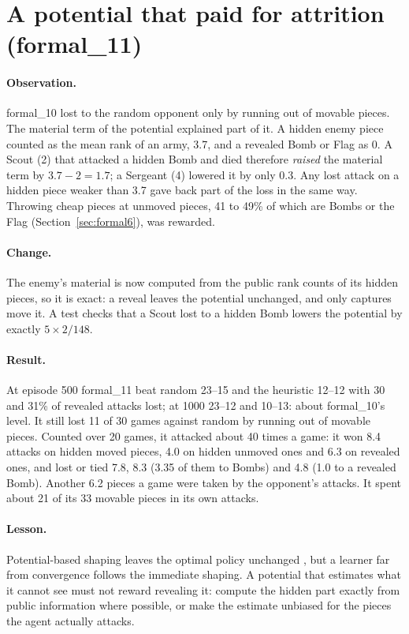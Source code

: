 \section{A potential that paid for attrition (formal\_11)}
\label{sec:formal11}

\paragraph{Observation.} formal\_10 lost to the random opponent only by running out of movable
pieces. The material term of the potential explained part of it. A hidden enemy piece counted as
the mean rank of an army, 3.7, and a revealed Bomb or Flag as 0. A Scout (2) that attacked a
hidden Bomb and died therefore \emph{raised} the material term by $3.7 - 2 = 1.7$; a Sergeant (4)
lowered it by only 0.3. Any lost attack on a hidden piece weaker than 3.7 gave back part of the
loss in the same way. Throwing cheap pieces at unmoved pieces, 41 to 49\% of which are Bombs or the
Flag (Section~\ref{sec:formal6}), was rewarded.

\paragraph{Change.} The enemy's material is now computed from the public rank counts of its hidden
pieces, so it is exact: a reveal leaves the potential unchanged, and only captures move it. A
test checks that a Scout lost to a hidden Bomb lowers the potential by exactly $5 \times 2/148$.

\paragraph{Result.} At episode 500 formal\_11 beat random 23--15 and the heuristic 12--12 with 30
and 31\% of revealed attacks lost; at 1000 23--12 and 10--13: about formal\_10's level. It still lost
11 of 30 games against random by running out of movable pieces. Counted over 20 games, it attacked
about 40 times a game: it won 8.4 attacks on hidden moved pieces, 4.0 on hidden unmoved ones and 6.3
on revealed ones, and lost or tied 7.8, 8.3 (3.35 of them to Bombs) and 4.8 (1.0 to a revealed Bomb).
Another 6.2 pieces a game were taken by the opponent's attacks. It spent about 21 of its 33 movable
pieces in its own attacks.

\paragraph{Lesson.} Potential-based shaping leaves the optimal policy unchanged \cite{NgPBRS}, but a
learner far from convergence follows the immediate shaping. A potential that estimates what it
cannot see must not reward revealing it: compute the hidden part exactly from public information
where possible, or make the estimate unbiased for the pieces the agent actually attacks.

